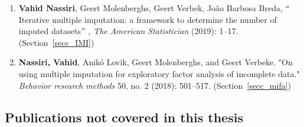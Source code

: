 \documentclass[11pt,a5paper,twoside]{book}
\begin{document}
\begin{enumerate}
		
	\item \textbf{\textcolor[HTML]{222222}{Vahid Nassiri}}\textcolor[HTML]{222222}{, Geert Molenberghs, Geert Verbek, João Barbosa Breda, $``$Iterative multiple imputation: a framework to determine the number of imputed datasets$"$ , \textit{The American Statistician} (2019): 1--17.} (Section~\ref{secc_IMI})
	
	\item \textbf{\textcolor[HTML]{222222}{Nassiri, Vahid}}\textcolor[HTML]{222222}{, Anikó Lovik, Geert Molenberghs, and Geert Verbeke. "On using multiple imputation for exploratory factor analysis of incomplete data." \textit{Behavior research methods} 50, no. 2 (2018): 501--517.} (Section~\ref{secc_mifa})

	

	
	\end{enumerate}
 
\subsection{Publications not covered in this thesis}
\end{document}
